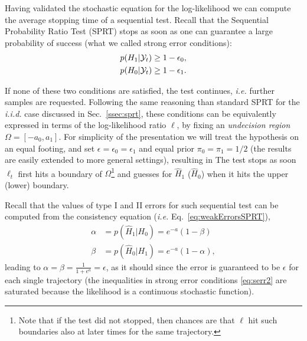 Having validated the stochastic equation for the log-likelihood we can compute the average stopping time of a sequential test. Recall that the Sequential Probability Ratio Test (SPRT) stops as soon as one can guarantee a large probability of success (what we called strong error conditions):
\begin{align}\label{eq:serr2}
p(H_1|\mathcal{Y}_t) &\geq 1-\epsilon_{0}, \\
p(H_0|\mathcal{Y}_t) &\geq 1-\epsilon_{1}.
\end{align}

If none of these two conditions are satisfied, the test continues, \textit{i.e.} further samples are requested. Following the same reasoning than standard SPRT for the \textit{i.i.d.} case discussed in Sec.~\ref{ssec:sprt}, these conditions can be equivalently expressed in terms of the log-likelihood ratio $\ell$, by fixing an \textit{undecision region} $\Omega = [-a_{0},a_{1}]$.
For simplicity of the presentation we will treat the hypothesis on an equal footing, and set $\epsilon=\epsilon_0 = \epsilon_1$ and equal prior
$\pi_0 = \pi_1=1/2$ (the results are easily extended to more general settings), resulting in
The test stops as soon $\ell_{t}$ first hits a boundary of $\Omega$\footnote{Note that if the test did not stopped, then chances are that $\ell$ hit such boundaries also at later times for the same trajectory.} and guesses for $\hat H_{1}$ ($\hat H_{0}$) when it hits the upper (lower) boundary.

Recall that the values of type I and II errors for such sequential test can be computed from the consistency equation (\textit{i.e.} Eq.~\ref{eq:weakErrorsSPRT}),
\begin{align}\label{eq:cmon_sprt_weak}
\alpha &= p(\hat{H}_1|H_0) = e^{-a}(1-\beta)\\
\beta &= p(\hat{H}_0|H_1) = e^{-a} (1-\alpha),
\end{align}
leading to
$ \alpha  =\beta=\frac{1}{1+e^{a}}=\epsilon$, as it should since the error is guaranteed to be $\epsilon$
for each single trajectory (the inequalities in strong error conditions \eqref{eq:serr2} are saturated because
the likelihood is a continuous stochastic function).


